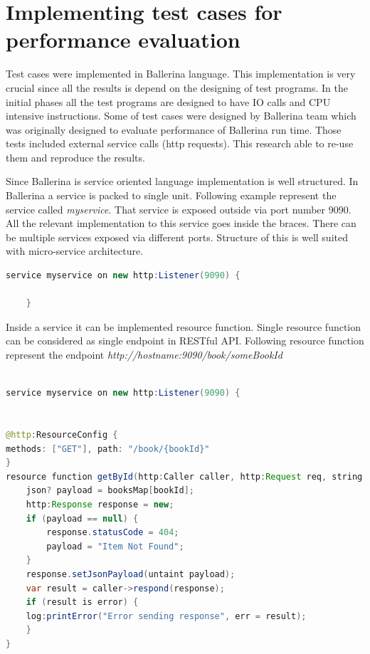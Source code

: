\section{Implementing test cases for performance evaluation}

Test cases were implemented in Ballerina language. This implementation is very crucial since all the results is depend on the designing of test programs. In the initial phases  all the test programs are designed to have IO calls and CPU intensive instructions. Some of test cases were designed by Ballerina team \cite{Ballerina_Performance} which was originally designed to evaluate performance of Ballerina run time. Those tests included external service calls (http requests). This research able to re-use them and reproduce the results.

Since Ballerina is service oriented language implementation is well structured. In Ballerina a service is packed to single unit. Following example represent the service called \textit{myservice}. That service is exposed outside via port number 9090. All the relevant implementation to this service goes inside the braces. There can be multiple services exposed via different ports. Structure of this is well suited with micro-service architecture.

\begin{lstlisting}[language=Java]
 service myservice on new http:Listener(9090) {
	
	}

\end{lstlisting}

Inside a service it can be implemented resource function. Single resource function can be considered as single endpoint in RESTful API. Following resource function represent the endpoint \textit{http://hostname:9090/book/someBookId}

\begin{lstlisting}[language=Java]

service myservice on new http:Listener(9090) {


@http:ResourceConfig {
methods: ["GET"], path: "/book/{bookId}"
}
resource function getById(http:Caller caller, http:Request req, string bookId) {
	json? payload = booksMap[bookId];
	http:Response response = new;
	if (payload == null) {
		response.statusCode = 404;
		payload = "Item Not Found";
	}
	response.setJsonPayload(untaint payload);
	var result = caller->respond(response);
	if (result is error) {
	log:printError("Error sending response", err = result);
	}
}

\end{lstlisting}

